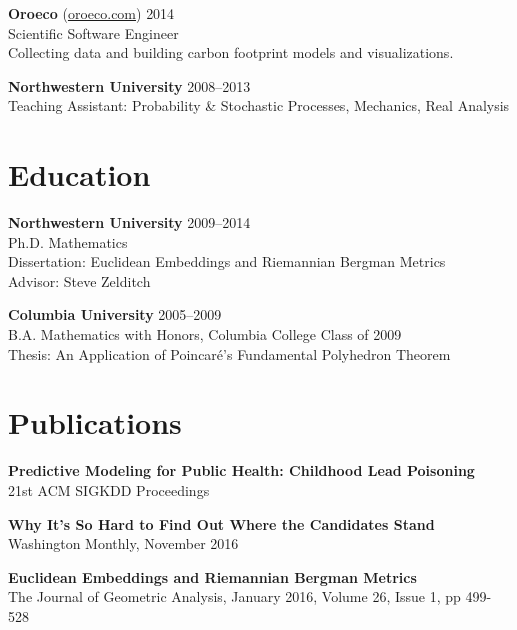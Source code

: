 \documentclass[margin,line]{resume}
\begin{document}
\begin{resume}
	{\bf Oroeco} (\href{http://www.oroeco.com}{oroeco.com}) \hfill {2014} \\
	Scientific Software Engineer \\
	Collecting data and building carbon footprint models and visualizations. 

	{\bf Northwestern University} \hfill {2008--2013}\\
	Teaching Assistant: Probability \& Stochastic Processes, Mechanics, Real Analysis%
	

    \section{\mysidestyle Education}
	
	{\bf Northwestern University} \hfill {2009--2014} \\%
	Ph.D. Mathematics \\
	Dissertation: Euclidean Embeddings and Riemannian Bergman Metrics \\
	Advisor: Steve Zelditch 

	{\bf Columbia University} \hfill {2005--2009} \\%
    B.A. Mathematics with Honors, Columbia College Class of 2009 \\
	Thesis: An Application of Poincar\'e's Fundamental Polyhedron Theorem

	
	\section{\mysidestyle Publications}
	{\bf Predictive Modeling for Public Health: Childhood Lead Poisoning} \\
    21st ACM SIGKDD Proceedings

        {\bf Why It’s So Hard to Find Out Where the Candidates Stand} \\
        Washington Monthly, November 2016

	{\bf Euclidean Embeddings and Riemannian Bergman Metrics} \\
	The Journal of Geometric Analysis, January 2016, Volume 26, Issue 1, pp 499-528


\end{resume}
\end{document}
